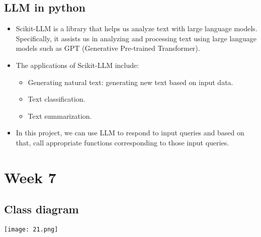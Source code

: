 \documentclass[12pt]{scrartcl}
\begin{document}
\subsection{LLM in python}
\begin{itemize}
\item Scikit-LLM is a library that helps us analyze text with large language models. Specifically, it assists us in analyzing and processing text using large language models such as GPT (Generative Pre-trained Transformer).
\item The applications of Scikit-LLM include:

\begin{itemize}
    \item Generating natural text: generating new text based on input data.
    \item Text classification.
    \item Text summarization.
\end{itemize}
\item In this project, we can use LLM to respond to input queries and based on that, call appropriate functions corresponding to those input queries.
\end{itemize}

\newpage
\section{Week 7}
\subsection{Class diagram}
        \begin{center}
            \texttt{[image: 21.png]}
        \end{center}
\newpage
\end{document}
